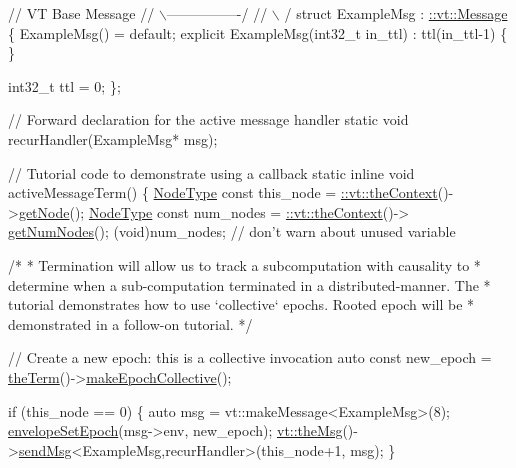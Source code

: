 \begin{DoxyCodeInclude}
\textcolor{comment}{//              VT Base Message}
\textcolor{comment}{//             \(\backslash\)----------------/}
\textcolor{comment}{//              \(\backslash\)              /}
\textcolor{keyword}{struct }ExampleMsg : \hyperlink{structvt_1_1messaging_1_1_active_msg}{::vt::Message} \{
  ExampleMsg() = \textcolor{keywordflow}{default};
  \textcolor{keyword}{explicit} ExampleMsg(int32\_t in\_ttl) : ttl(in\_ttl-1) \{ \}

  int32\_t ttl = 0;
\};

\textcolor{comment}{// Forward declaration for the active message handler}
\textcolor{keyword}{static} \textcolor{keywordtype}{void} recurHandler(ExampleMsg* msg);

\textcolor{comment}{// Tutorial code to demonstrate using a callback}
\textcolor{keyword}{static} \textcolor{keyword}{inline} \textcolor{keywordtype}{void} activeMessageTerm() \{
  \hyperlink{namespacevt_a866da9d0efc19c0a1ce79e9e492f47e2}{NodeType} \textcolor{keyword}{const} this\_node = \hyperlink{namespacevt_a26551fe0e6e6a1371111df5b12c7e92c}{::vt::theContext}()->\hyperlink{structvt_1_1ctx_1_1_context_a0d52c263ce8516546a67443d9a86fa5f}{getNode}();
  \hyperlink{namespacevt_a866da9d0efc19c0a1ce79e9e492f47e2}{NodeType} \textcolor{keyword}{const} num\_nodes = \hyperlink{namespacevt_a26551fe0e6e6a1371111df5b12c7e92c}{::vt::theContext}()->
      \hyperlink{structvt_1_1ctx_1_1_context_a7f41071aadf6d5fa9e1b6c703c5ff19d}{getNumNodes}();
  (void)num\_nodes;  \textcolor{comment}{// don't warn about unused variable}

  \textcolor{comment}{/*}
\textcolor{comment}{   * Termination will allow us to track a subcomputation with causality to}
\textcolor{comment}{   * determine when a sub-computation terminated in a distributed-manner. The}
\textcolor{comment}{   * tutorial demonstrates how to use `collective` epochs. Rooted epoch will be}
\textcolor{comment}{   * demonstrated in a follow-on tutorial.}
\textcolor{comment}{   */}

  \textcolor{comment}{// Create a new epoch: this is a collective invocation}
  \textcolor{keyword}{auto} \textcolor{keyword}{const} new\_epoch = \hyperlink{namespacevt_a127580fdfcaba0b4171e5c48c5676733}{theTerm}()->\hyperlink{structvt_1_1term_1_1_termination_detector_aeba62165ec8dfbc445e3631ff295f159}{makeEpochCollective}();

  \textcolor{keywordflow}{if} (this\_node == 0) \{
    \textcolor{keyword}{auto} msg = vt::makeMessage<ExampleMsg>(8);
    \hyperlink{namespacevt_a4a0a9928690206b588dbcac2afb71088}{envelopeSetEpoch}(msg->env, new\_epoch);
    \hyperlink{namespacevt_aeafd31f866aeb4dc6fc2f6ee97136350}{vt::theMsg}()->\hyperlink{group__preregister_ga0162a39473e7f9b490a79a7983d949ac}{sendMsg}<ExampleMsg,recurHandler>(this\_node+1, msg);
  \}


\end{DoxyCodeInclude}

